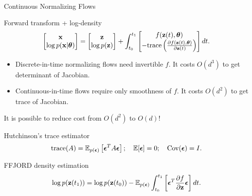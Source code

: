 \begin{frame}{Continuous Normalizing Flows}
	\begin{block}{Forward transform + log-density}
		\vspace{-0.8cm}
		\[
			\begin{bmatrix}
				\mathbf{x} \\
				\log p(\mathbf{x} | \boldsymbol{\theta})
			\end{bmatrix}
			= 
			\begin{bmatrix}
				\mathbf{z} \\
				\log p(\mathbf{z})
			\end{bmatrix} + 
			\int_{t_0}^{t_1} 
			\begin{bmatrix}
				f(\mathbf{z}(t), \boldsymbol{\theta}) \\
				- \text{trace} \left( \frac{\partial f(\mathbf{z}(t), \boldsymbol{\theta})}{\partial \mathbf{z}(t)} \right) 
			\end{bmatrix} dt.
		\]
		\vspace{-0.4cm}
	\end{block}
	\begin{itemize}
		\item Discrete-in-time normalizing flows need invertible $f$. It costs $O(d^3)$ to get determinant of Jacobian.
		\item Continuous-in-time flows require only smoothness of $f$. It costs $O(d^2)$ to get trace of Jacobian.
	\end{itemize}
	It is possible to reduce cost from $O(d^2)$ to $O(d)$!
	\begin{block}{Hutchinson's trace estimator}
		\vspace{-0.3cm}
		\[
		    \text{trace}(A) = \mathbb{E}_{p(\boldsymbol{\epsilon})} \left[ \boldsymbol{\epsilon}^T A \boldsymbol{\epsilon} \right]; \quad \mathbb{E} [\boldsymbol{\epsilon}] = 0; \quad \text{Cov} (\boldsymbol{\epsilon}) = I.
		\]
		\vspace{-0.5cm}
	\end{block}
	\begin{block}{FFJORD density estimation}
		\vspace{-0.4cm}
		\[
		    \log p(\mathbf{z}(t_1)) = \log p(\mathbf{z}(t_0)) - \mathbb{E}_{p(\boldsymbol{\epsilon})} \int_{t_0}^{t_1} \left[ \boldsymbol{\epsilon}^T \frac{\partial f}{\partial \mathbf{z}} \boldsymbol{\epsilon} \right] dt.
		\]
	\end{block}
\end{frame}
